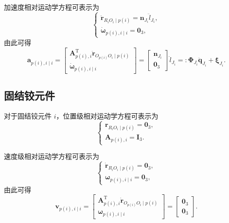 加速度相对运动学方程可表示为
\begin{equation}\label{eq:10.24}
  \begin{cases}
    \ddot{\boldsymbol{r}}_{R_i O_i \mid p(i)} = \boldsymbol{n}_{J_i} \ddot{l}_{J_i}, \\
    \dot{\boldsymbol{\omega}}_{p(i),i \mid i} = \boldsymbol{0}_3,
  \end{cases}
\end{equation}
由此可得
\begin{equation}\label{eq:10.25}
  \boldsymbol{a}_{p(i),i \mid i} = \begin{bmatrix} \boldsymbol{A}_{p(i),i}^{\mathrm{T}} \ddot{\boldsymbol{r}}_{O_{p(i)} O_i \mid p(i)} \\ \dot{\boldsymbol{\omega}}_{p(i),i \mid i} \end{bmatrix}
  = \begin{bmatrix} \boldsymbol{n}_{J_i} \\ \boldsymbol{0}_3 \end{bmatrix} \ddot{l}_{J_i}
  =: \boldsymbol{\Phi}_{J_i} \ddot{\boldsymbol{q}}_{J_i} + \boldsymbol{\xi}_{J_i}.
\end{equation}

\subsection{固结铰元件}

对于固结铰元件 $i$，位置级相对运动学方程可表示为
\begin{equation}\label{eq:10.26}
  \begin{cases}
    \boldsymbol{r}_{R_i O_i \mid p(i)} = \boldsymbol{0}_3, \\
    \boldsymbol{A}_{p(i),i} = \boldsymbol{I}_3.
  \end{cases}
\end{equation}

速度级相对运动学方程可表示为
\begin{equation}\label{eq:10.27}
  \begin{cases}
    \dot{\boldsymbol{r}}_{R_i O_i \mid p(i)} = \boldsymbol{0}_3, \\
    \boldsymbol{\omega}_{p(i),i \mid i} = \boldsymbol{0}_3,
  \end{cases}
\end{equation}
由此可得
\begin{equation}\label{eq:10.28}
  \boldsymbol{v}_{p(i),i \mid i} = \begin{bmatrix} \boldsymbol{A}_{p(i),i}^{\mathrm{T}} \dot{\boldsymbol{r}}_{O_{p(i)} O_i \mid p(i)} \\ \boldsymbol{\omega}_{p(i),i \mid i} \end{bmatrix}
  = \begin{bmatrix} \boldsymbol{0}_3 \\ \boldsymbol{0}_3 \end{bmatrix}.
\end{equation}

